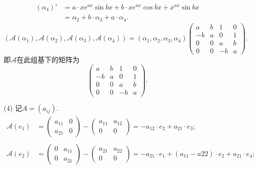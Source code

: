 \documentclass{article}
\begin{document}
\begin{enumerate}
\begin{enumerate}
\begin{align*}
            {(\alpha_4)}' 
            &=a\cdot x e^{ax} \sin bx +b\cdot x e^{ax} \cos bx+ x^{ax} \sin bx\\
            &=\alpha_2+b\cdot \alpha_3+a\cdot \alpha_4.
        \end{align*}
        \[
            \left(\mathcal{A}(\alpha_1),\mathcal{A}(\alpha_2),\mathcal{A}(\alpha_3),\mathcal{A}(\alpha_4) \right)
            =(\alpha_1,\alpha_2,\alpha_3,\alpha_4)
            \begin{pmatrix}
                a & b & 1 & 0\\
                -b & a & 0 & 1\\
                0 & 0 & a & b\\
                0 & 0 & -b & a
            \end{pmatrix}.
        \]
        即$\mathcal{A}$在此组基下的矩阵为
        \[
            \begin{pmatrix}
                a & b & 1 & 0\\
                -b & a & 0 & 1\\
                0 & 0 & a & b\\
                0 & 0 & -b & a
            \end{pmatrix}.
        \]
        \item [(4)]记$A=(a_{ij})$.
        \begin{align*}
            \mathcal{A}(e_1) 
            &=\begin{pmatrix}
                a_{11} & 0\\
                a_{21} & 0
            \end{pmatrix}
            -\begin{pmatrix}
                a_{11} & a_{12}\\
                0 & 0
            \end{pmatrix}
            =-a_{12}\cdot e_2+a_{21}\cdot e_3;\\
            & \\
            \mathcal{A}(e_2) 
            &=\begin{pmatrix}
                0 & a_{11}\\
                0 & a_{21}
            \end{pmatrix}
            -\begin{pmatrix}
                a_{21} & a_{22}\\
                0 & 0
            \end{pmatrix}
            =-a_{21}\cdot e_1 + (a_{11}-a{22})\cdot e_2 + a_{21}\cdot e_4;\\

\end{align*}
\end{enumerate}
\end{enumerate}
\end{document}
